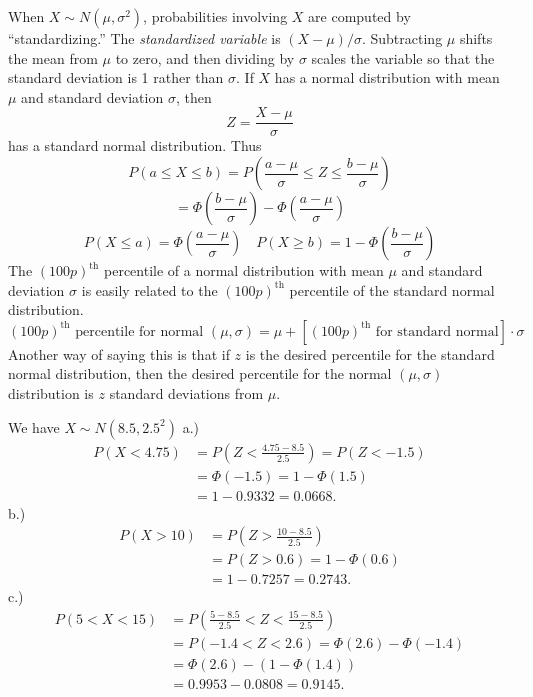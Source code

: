 \documentclass{report}
\begin{document}
 \begin{remark}
     When \( X \sim N(\mu, \sigma^2) \), probabilities involving \( X \) are computed by “standardizing.” The \textit{standardized variable} is \( (X - \mu)/\sigma \). Subtracting \( \mu \) shifts the mean from \( \mu \) to zero, and then dividing by \( \sigma \) scales the variable so that the standard deviation is 1 rather than \( \sigma \).
     \bigbreak \noindent 
     If \( X \) has a normal distribution with mean \( \mu \) and standard deviation \( \sigma \), then
     \[
         Z = \frac{X - \mu}{\sigma}
     \]
     has a standard normal distribution. Thus
     \[
         P(a \leq X \leq b) = P\left( \frac{a - \mu}{\sigma} \leq Z \leq \frac{b - \mu}{\sigma} \right)
     \]
     \[
         = \Phi\left( \frac{b - \mu}{\sigma} \right) - \Phi\left( \frac{a - \mu}{\sigma} \right)
     \]
     \[
         P(X \leq a) = \Phi\left( \frac{a - \mu}{\sigma} \right) \quad P(X \geq b) = 1 - \Phi\left( \frac{b - \mu}{\sigma} \right)
     \]
     \bigbreak \noindent 
     The \((100p)^{\text{th}}\) percentile of a normal distribution with mean \(\mu\) and standard deviation \(\sigma\) is easily related to the \((100p)^{\text{th}}\) percentile of the standard normal distribution.
     \[
         (100p)^{\text{th}} \text{ percentile for normal } (\mu, \sigma) = \mu + \left[ (100p)^{\text{th}} \text{ for standard normal} \right] \cdot \sigma
     \]
     Another way of saying this is that if \(z\) is the desired percentile for the standard normal distribution, then the desired percentile for the normal \((\mu, \sigma)\) distribution is \(z\) standard deviations from \(\mu\).
     \smiley{}
 \end{remark}
 \pagebreak \bigbreak \noindent 
 We have $X \sim N(8.5, 2.5^{2}) $
 \bigbreak \noindent 
 a.) 
 \begin{align*}
     P(X < 4.75) &= P\left(Z < \frac{4.75-8.5}{2.5}\right) = P(Z < -1.5)  \\ 
     &= \Phi(-1.5) = 1-\Phi(1.5) \\
     &=1-0.9332 = 0.0668
 .\end{align*}
 \bigbreak \noindent 
 b.)
 \begin{align*}
     P(X > 10) &= P\left(Z > \frac{10-8.5}{2.5}\right) \\
     &= P(Z > 0.6) = 1-\Phi(0.6)  \\
     &= 1-0.7257 = 0.2743
 .\end{align*}
 \bigbreak \noindent 
 c.) 
 \begin{align*}
     P(5 < X < 15) &= P\left(\frac{5-8.5}{2.5} < Z < \frac{15-8.5}{2.5}\right) \\
                   &=P(-1.4 < Z < 2.6) = \Phi(2.6) - \Phi(-1.4) \\
                   &=\Phi(2.6) - (1-\Phi(1.4)) \\
                   &=0.9953 - 0.0808 = 0.9145
 .\end{align*}
\end{document}
